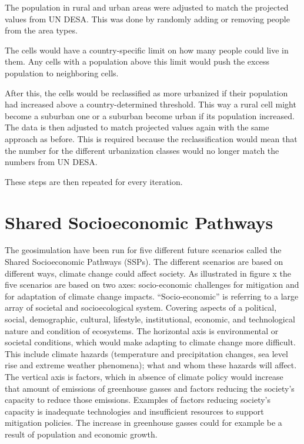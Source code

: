 The population in rural and urban areas were adjusted to match the projected values from UN DESA. This was done by randomly adding or removing people from the area types. 

The cells would have a country-specific limit on how many people could live in them. Any cells with a population above this limit would push the excess population to neighboring cells. 

After this, the cells would be reclassified as more urbanized if their population had increased above a country-determined threshold. This way a rural cell might become a suburban one or a suburban become urban if its population increased. The data is then adjusted to match projected values again with the same approach as before. This is required because the reclassification would mean that the number for the different urbanization classes would no longer match the numbers from UN DESA.

These steps are then repeated for every iteration. 

\citep{Kessler}
\section{Shared Socioeconomic Pathways}



The geosimulation have been run for five different future scenarios called the Shared Socioeconomic Pathways (SSPs). The different scenarios are based on different ways, climate change could affect society. As illustrated in figure x the five scenarios are based on two axes: socio-economic challenges for mitigation and for adaptation of climate change impacts. 
“Socio-economic” is referring to a large array of societal and socioecological system. Covering aspects of a political, social, demographic, cultural, lifestyle, institutional, economic, and technological nature and condition of ecosystems. 
The horizontal axis is environmental or societal conditions, which would make adapting to climate change more difficult. This include climate hazards (temperature and precipitation changes, sea level rise and extreme weather phenomena); what and whom these hazards will affect.
\citep{ConceptSSP}
The vertical axis is factors, which in absence of climate policy would increase that amount of emissions of greenhouse gasses and factors reducing the society’s capacity to reduce those emissions. Examples of factors reducing society’s capacity is inadequate technologies and insufficient resources to support mitigation policies. The increase in greenhouse gasses could for example be a result of population and economic growth.
\citep{SSP}

